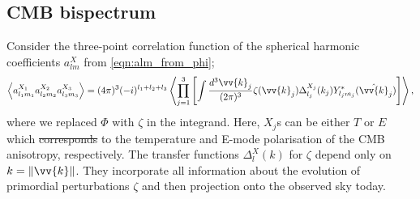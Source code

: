 \documentclass[a4paper,12pt,times,custombib,print,index]{Classes/PhDThesisPSnPDF} %
\providecommand{\DIFadd}[1]{{\protect\color{blue}\uwave{#1}}} %
\providecommand{\DIFdel}[1]{{\protect\color{red}\sout{#1}}}                      %
\providecommand{\DIFaddbegin}{} %
\providecommand{\DIFaddend}{} %
\providecommand{\DIFdelbegin}{} %
\providecommand{\DIFdelend}{} %
\newcommand{\DIFscaledelfig}{0.5}
\newlength{\DIFdelgraphicswidth} %
\newlength{\DIFdelgraphicsheight} %
\newcommand{\DIFaddincludegraphics}[2][]{{\color{blue}\fbox{\DIFOincludegraphics[#1]{#2}}}} %
\newcommand{\DIFdelincludegraphics}[2][]{%
\sbox{\DIFdelgraphicsbox}{\DIFOincludegraphics[#1]{#2}}%
\settoboxwidth{\DIFdelgraphicswidth}{\DIFdelgraphicsbox} %
\settoboxtotalheight{\DIFdelgraphicsheight}{\DIFdelgraphicsbox} %
\scalebox{\DIFscaledelfig}{%
\parbox[b]{\DIFdelgraphicswidth}{\usebox{\DIFdelgraphicsbox}\\[-\baselineskip] \rule{\DIFdelgraphicswidth}{0em}}\llap{\resizebox{\DIFdelgraphicswidth}{\DIFdelgraphicsheight}{%
\setlength{\unitlength}{\DIFdelgraphicswidth}%
\begin{picture}(1,1)%
\thicklines\linethickness{2pt} %
{\color[rgb]{1,0,0}\put(0,0){\framebox(1,1){}}}%
{\color[rgb]{1,0,0}\put(0,0){\line( 1,1){1}}}%
{\color[rgb]{1,0,0}\put(0,1){\line(1,-1){1}}}%
\end{picture}%
}\hspace*{3pt}}} %
} %
\DeclareRobustCommand{\DIFaddbegin}{\DIFOaddbegin \let\includegraphics\DIFaddincludegraphics} %
\DeclareRobustCommand{\DIFaddend}{\DIFOaddend \let\includegraphics\DIFOincludegraphics} %
\DeclareRobustCommand{\DIFdelbegin}{\DIFOdelbegin \let\includegraphics\DIFdelincludegraphics} %
\DeclareRobustCommand{\DIFdelend}{\DIFOaddend \let\includegraphics\DIFOincludegraphics} %
\begin{document}
\subsection{CMB bispectrum}

Consider the three-point correlation function of the spherical harmonic coefficients $a_{lm}^X$ from \eqref{eqn:alm_from_phi};
\begin{align}
	\left< a_{l_1 m_1}^{X_1} a_{l_2 m_2}^{X_2} a_{l_3 m_3}^{X_3}  \right> = (4\pi)^3 (-i)^{l_1 + l_2 + l_3} \left< \prod_{j=1}^{3} \left[ \int \frac{d^3\vv{k}_j}{(2\pi)^3} \zeta(\vv{k}_j)   \Delta_{l_j}^{X_j} (k_j) Y^*_{l_j m_j} (\hat{\vv{k}}_j) \right] \right>, \label{eqn:bispectrum_derivation_base_form}
\end{align}
where we replaced $\Phi$ with $\zeta$ in the integrand. Here, $X_j$s can be either $T$ or $E$ which \DIFdelbegin \DIFdel{corresponds }\DIFdelend \DIFaddbegin \DIFadd{correspond }\DIFaddend to the temperature and E-mode polarisation of the CMB anisotropy, respectively. The transfer functions $\Delta_l^X (k)$ for $\zeta$ depend only on $k=\left\| \vv{k} \right\|$. They incorporate all information about the evolution of \DIFaddbegin \DIFadd{the }\DIFaddend primordial perturbations $\zeta$ and then projection onto the observed sky today.
\end{document}
